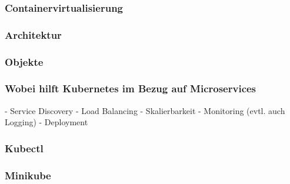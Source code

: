 \subsubsection{Containervirtualisierung}

\subsubsection{Architektur}

\subsubsection{Objekte}

\subsubsection{Wobei hilft Kubernetes im Bezug auf Microservices}

- Service Discovery
- Load Balancing
- Skalierbarkeit
- Monitoring (evtl. auch Logging)
- Deployment

\subsubsection{Kubectl}

\subsubsection{Minikube}
